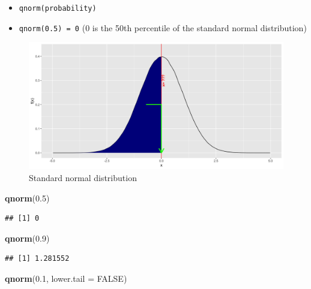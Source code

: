 \documentclass[]{book}
\newenvironment{Shaded}{\begin{snugshade}}{\end{snugshade}}
\newcommand{\DataTypeTok}[1]{\textcolor[rgb]{0.13,0.29,0.53}{#1}}
\newcommand{\FloatTok}[1]{\textcolor[rgb]{0.00,0.00,0.81}{#1}}
\newcommand{\KeywordTok}[1]{\textcolor[rgb]{0.13,0.29,0.53}{\textbf{#1}}}
\newcommand{\NormalTok}[1]{#1}
\newcommand{\OtherTok}[1]{\textcolor[rgb]{0.56,0.35,0.01}{#1}}
\begin{document}
\begin{itemize}
\item
  \texttt{qnorm(probability)}
\item
  \texttt{qnorm(0.5)\ =\ 0} (0 is the 50th percentile of the standard normal distribution)
\end{itemize}

\begin{figure}

{\centering \includegraphics{figure/norm1b-1} 

}

\caption{Standard normal distribution}\label{fig:norm1b}
\end{figure}

\begin{Shaded}
\begin{Highlighting}[]
\KeywordTok{qnorm}\NormalTok{(}\FloatTok{0.5}\NormalTok{)}
\end{Highlighting}
\end{Shaded}

\begin{verbatim}
## [1] 0
\end{verbatim}

\begin{Shaded}
\begin{Highlighting}[]
\KeywordTok{qnorm}\NormalTok{(}\FloatTok{0.9}\NormalTok{)}
\end{Highlighting}
\end{Shaded}

\begin{verbatim}
## [1] 1.281552
\end{verbatim}

\begin{Shaded}
\begin{Highlighting}[]
\KeywordTok{qnorm}\NormalTok{(}\FloatTok{0.1}\NormalTok{, }\DataTypeTok{lower.tail =} \OtherTok{FALSE}\NormalTok{)}
\end{Highlighting}
\end{Shaded}
\end{document}

